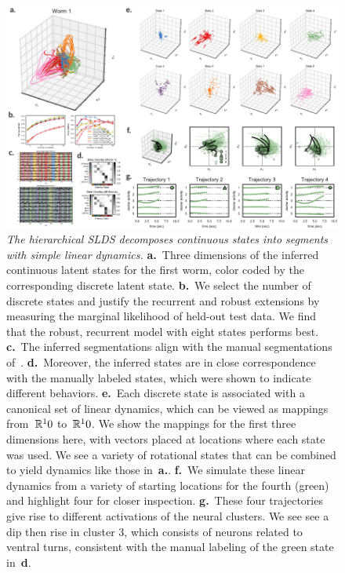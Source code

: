 \documentclass[11pt]{article}
\begin{document}
\begin{figure}[t!]
\centering
\includegraphics[width=6in]{figures/figure3} 
\caption{ \textit{The hierarchical SLDS decomposes continuous states
    into segments with simple linear dynamics.}
  \textbf{a.}~Three dimensions of the inferred continuous latent states
  for the first worm, color coded by the corresponding discrete latent
  state.
  \textbf{b.}~We select the number of discrete states and justify the
  recurrent and robust extensions by measuring the marginal likelihood
  of held-out test data. We find that the robust, recurrent model
  with eight states performs best.
  \textbf{c.}~The inferred segmentations align with the manual segmentations
  of~\citet{kato2015global}.
  \textbf{d.}~Moreover, the inferred states are in close correspondence with
  the manually labeled states, which were shown to indicate different behaviors.
  \textbf{e.}~Each discrete state is associated with a canonical set of linear
  dynamics, which can be viewed as mappings from~$\mathbb{R}^10$ to~$\mathbb{R}^10$.
  We show the mappings for the first three dimensions here, with vectors placed
  at locations where each state was used.  We see a variety of rotational
  states that can be combined to yield dynamics like those in~\textbf{a.}.
  \textbf{f.}~We simulate these linear dynamics from a variety of starting
  locations for the fourth (green) and highlight four for closer inspection.
  \textbf{g.}~These four trajectories give rise to different activations of
  the neural clusters. We see see a dip then rise in cluster 3, which consists
  of neurons related to ventral turns, consistent with the manual labeling
  of the green state in~\textbf{d}.
}
\label{fig:syllables}
\end{figure}
\end{document}

